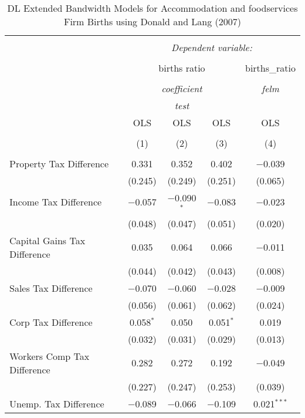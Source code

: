 
\begin{table}[!htbp] \centering 
  \caption{DL Extended Bandwidth Models for  Accommodation and foodservices Firm Births using Donald and Lang (2007)} 
  \label{} 
\begin{tabular}{@{\extracolsep{5pt}}lcccc} 
\\[-1.8ex]\hline 
\hline \\[-1.8ex] 
 & \multicolumn{4}{c}{\textit{Dependent variable:}} \\ 
\cline{2-5} 
\\[-1.8ex] & \multicolumn{3}{c}{births ratio} & births\_ratio \\ 
\\[-1.8ex] & \multicolumn{3}{c}{\textit{coefficient}} & \textit{felm} \\ 
 & \multicolumn{3}{c}{\textit{test}} & \textit{} \\ 
 & OLS & OLS & OLS & OLS \\ 
\\[-1.8ex] & (1) & (2) & (3) & (4)\\ 
\hline \\[-1.8ex] 
 Property Tax Difference & 0.331 & 0.352 & 0.402 & $-$0.039 \\ 
  & (0.245) & (0.249) & (0.251) & (0.065) \\ 
  Income Tax Difference & $-$0.057 & $-$0.090$^{*}$ & $-$0.083 & $-$0.023 \\ 
  & (0.048) & (0.047) & (0.051) & (0.020) \\ 
  Capital Gains Tax Difference & 0.035 & 0.064 & 0.066 & $-$0.011 \\ 
  & (0.044) & (0.042) & (0.043) & (0.008) \\ 
  Sales Tax Difference & $-$0.070 & $-$0.060 & $-$0.028 & $-$0.009 \\ 
  & (0.056) & (0.061) & (0.062) & (0.024) \\ 
  Corp Tax Difference & 0.058$^{*}$ & 0.050 & 0.051$^{*}$ & 0.019 \\ 
  & (0.032) & (0.031) & (0.029) & (0.013) \\ 
  Workers Comp Tax Difference & 0.282 & 0.272 & 0.192 & $-$0.049 \\ 
  & (0.227) & (0.247) & (0.253) & (0.039) \\ 
  Unemp. Tax Difference & $-$0.089 & $-$0.066 & $-$0.109 & 0.021$^{***}$ \\ 

\end{tabular}
\end{table}
